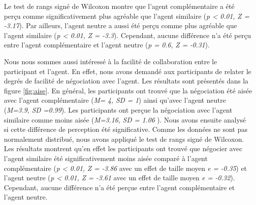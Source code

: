 		
		Le test de rangs signé de Wilcoxon montre que l'agent complémentaire a été perçu comme significativement plus agréable que l'agent similaire (\emph{p < 0.01, Z = -3.17}). Par ailleurs, l'agent neutre a aussi été perçu comme plus agréable que l'agent similaire (\emph{p < 0.01, Z = -3.3}). Cependant, aucune différence n'a été perçu entre l'agent complémentaire et l'agent neutre (\emph{p = 0.6, Z = -0.31}).
	
		Nous nous sommes aussi intéressé à la facilité de collaboration entre le participant et l'agent. En effet, nous avons demandé aux participants de relater le degrés de facilité de négociation avec l'agent. Les résultats sont présentés dans la figure \ref{fig:aise}. En général, les participants ont trouvé que la négociation été aisée avec l'agent complémentaire (\emph{M= 4, SD = 1}) ainsi qu'avec l'agent neutre (\emph{M=3.9, SD =0.99}). Les participants ont perçue la négociation avec l'agent similaire comme moins aisée (\emph{M=3.16, SD = 1.06 }). 
		Nous avons ensuite analysé si cette différence de perception été significative. Comme les données ne sont pas normalement distribué, nous avons appliqué le test de rangs signé de Wilcoxon. Les résultats montrent qu'en effet les participants ont trouvé que négocier avec l'agent similaire été significativement moins aisée comparé à l'agent complémentaire (\emph{p < 0.01, Z = -3.86} avec un effet de taille moyen \emph{e = -0.35}) et l'agent neutre (\emph{p < 0.01, Z = -3.61} avec un effet de taille moyen \emph{e = -0.32}).
		Cependant, aucune différence n'a été perçue entre l'agent complémentaire et l'agent neutre.
